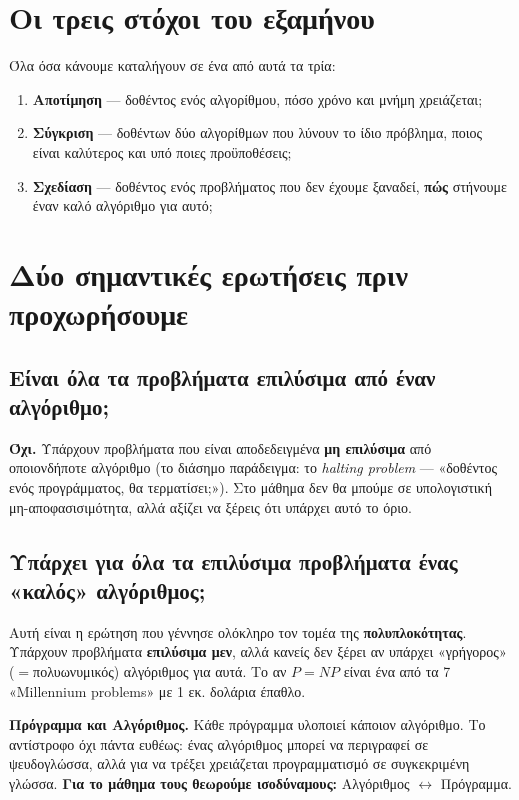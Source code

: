\documentclass[11pt,a4paper]{article}
\begin{document}
\section{Οι τρεις στόχοι του εξαμήνου}

Όλα όσα κάνουμε καταλήγουν σε ένα από αυτά τα τρία:

\begin{enumerate}
  \item \textbf{Αποτίμηση} --- δοθέντος ενός αλγορίθμου, πόσο χρόνο και μνήμη
  χρειάζεται;
  \item \textbf{Σύγκριση} --- δοθέντων δύο αλγορίθμων που λύνουν το ίδιο πρόβλημα,
  ποιος είναι καλύτερος και υπό ποιες προϋποθέσεις;
  \item \textbf{Σχεδίαση} --- δοθέντος ενός προβλήματος που δεν έχουμε ξαναδεί,
  \textbf{πώς} στήνουμε έναν καλό αλγόριθμο για αυτό;
\end{enumerate}

\section{Δύο σημαντικές ερωτήσεις πριν προχωρήσουμε}

\subsection{Είναι όλα τα προβλήματα επιλύσιμα από έναν αλγόριθμο;}

\textbf{Όχι.} Υπάρχουν προβλήματα που είναι αποδεδειγμένα \textbf{μη επιλύσιμα} από
οποιονδήποτε αλγόριθμο (το διάσημο παράδειγμα: το \textit{halting problem} ---
«δοθέντος ενός προγράμματος, θα τερματίσει;»). Στο μάθημα δεν θα μπούμε σε
υπολογιστική μη-αποφασισιμότητα, αλλά αξίζει να ξέρεις ότι υπάρχει αυτό το όριο.

\subsection{Υπάρχει για όλα τα επιλύσιμα προβλήματα ένας «καλός» αλγόριθμος;}

Αυτή είναι η ερώτηση που γέννησε ολόκληρο τον τομέα της \textbf{πολυπλοκότητας}.
Υπάρχουν προβλήματα \textbf{επιλύσιμα μεν}, αλλά κανείς δεν ξέρει αν υπάρχει
«γρήγορος» ($=$πολυωνυμικός) αλγόριθμος για αυτά. Το αν $P = NP$ είναι ένα από τα
7 «Millennium problems» με 1 εκ. δολάρια έπαθλο.

\begin{keypoint}
\textbf{Πρόγραμμα και Αλγόριθμος.} Κάθε πρόγραμμα υλοποιεί κάποιον αλγόριθμο. Το
αντίστροφο όχι πάντα ευθέως: ένας αλγόριθμος μπορεί να περιγραφεί σε ψευδογλώσσα,
αλλά για να τρέξει χρειάζεται προγραμματισμό σε συγκεκριμένη γλώσσα. \textbf{Για το
μάθημα τους θεωρούμε ισοδύναμους:} Αλγόριθμος $\leftrightarrow$ Πρόγραμμα.
\end{keypoint}
\end{document}
